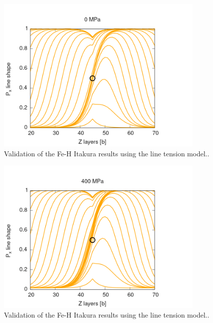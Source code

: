\documentclass[a4paper,11pt]{article}
\begin{document}
\begin{figure}[htbp]

\includegraphics[width=0.9\textwidth]{Images/H_itakura_0_MPa.png}
\caption{Validation of the Fe-H Itakura results using the line tension model.\label{kinkpairstress}.}
\end{figure}
\begin{figure}[htbp]

\includegraphics[width=0.9\textwidth]{Images/H_itakura_400_MPa.png}
\caption{Validation of the Fe-H Itakura results using the line tension model.\label{kinkpairstress}.}
\end{figure}
\end{document}

